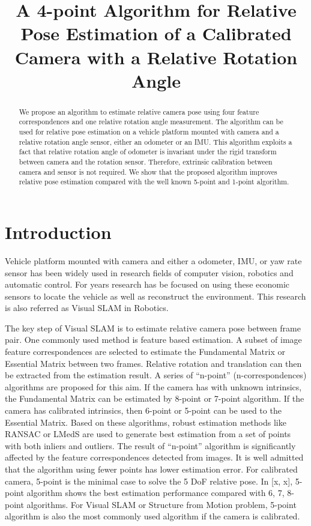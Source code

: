 \documentclass[letterpaper, 10 pt, conference]{ieeeconf}
\title{\LARGE \bf
A 4-point Algorithm for Relative Pose Estimation of a Calibrated Camera with a Relative Rotation Angle
}
\begin{document}
\maketitle

\begin{abstract}
We propose an algorithm to estimate relative camera pose using four feature correspondences and one relative rotation angle measurement. The algorithm can be used for relative pose estimation on a vehicle platform mounted with camera and a relative rotation angle sensor, either an odometer or an IMU. This algorithm exploits a fact that relative rotation angle of odometer is invariant under the rigid transform between camera and the rotation sensor. Therefore, extrinsic calibration between camera and sensor is not required. We show that the proposed algorithm improves relative pose estimation compared with the well known 5-point and 1-point algorithm. 
\end{abstract}


\section{Introduction}
Vehicle platform mounted with camera and either a odometer, IMU, or yaw rate sensor has been widely used in research fields of computer vision, robotics and automatic control. For years research has be focused on using these economic sensors to locate the vehicle as well as reconstruct the environment. This research is also referred as Visual SLAM in Robotics. 

The key step of Visual SLAM is to estimate relative camera pose between frame pair. One commonly used method is feature based estimation. A subset of image feature correspondences are selected to estimate the Fundamental Matrix or Essential Matrix between two frames. Relative rotation and translation can then be extracted from the estimation result. A series of ``n-point'' (n-correspondences) algorithms are proposed for this aim. If the camera has with unknown intrinsics, the Fundamental Matrix can be estimated by 8-point or 7-point \cite{hartley2000multiple} algorithm. If the camera has calibrated intrinsics, then 6-point \cite{stewenius2008minimal, li2006simple} or 5-point \cite{nister2004efficient, stewenius2006recent} can be used to the Essential Matrix. Based on these algorithms, robust estimation methods like RANSAC or LMedS are used to generate best estimation from a set of points with both inliers and outliers. The result of ``n-point'' algorithm is significantly affected by the feature correspondences detected from images. It is well admitted that the algorithm using fewer points has lower estimation error. For calibrated camera, 5-point is the minimal case to solve the 5 DoF relative pose. In [x, x], 5-point algorithm shows the best estimation performance compared with 6, 7, 8-point algorithms. For Visual SLAM or Structure from Motion problem, 5-point algorithm is also the most commonly used algorithm if the camera is calibrated. 
\end{document}
